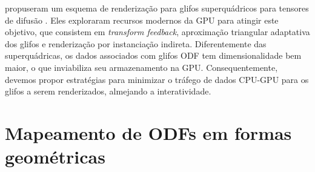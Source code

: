  propuseram um esquema de renderização para glifos superquádricos para tensores de difusão \cite{Kindlmann2004}. Eles exploraram recursos modernos da GPU para atingir este objetivo, que consistem em \textit{transform feedback}, aproximação triangular adaptativa dos glifos e renderização por instanciação indireta. Diferentemente das superquádricas, os dados associados com glifos ODF tem dimensionalidade bem maior, o que inviabiliza seu armazenamento na GPU. Consequentemente, devemos propor estratégias para minimizar o tráfego de dados CPU-GPU para os glifos a serem renderizados, almejando a interatividade.






\section{Mapeamento de ODFs em formas geométricas}
\label{sec::renderizacao_de_glifos_ODF}

